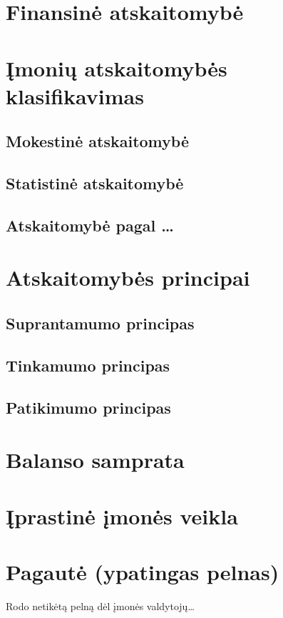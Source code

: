 \section{Finansinė atskaitomybė}

\section{Įmonių atskaitomybės klasifikavimas}

\subsection{Mokestinė atskaitomybė} 

\subsection{Statistinė atskaitomybė}

\subsection{Atskaitomybė pagal …}

\section{Atskaitomybės principai}

\subsection{Suprantamumo principas}
\subsection{Tinkamumo principas}
\subsection{Patikimumo principas}

\section{Balanso samprata}
\section{Įprastinė įmonės veikla}

\section{Pagautė (ypatingas pelnas)}
Rodo netikėtą pelną dėl įmonės valdytojų…

